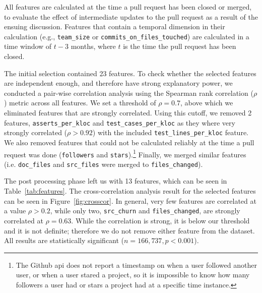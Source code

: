 \documentclass{sig-alternate}
\begin{document}
All features are calculated at the time a pull request has been closed or
merged, to evaluate the effect of intermediate updates to the pull request as a
result of the ensuing discussion. Features that contain a temporal dimension in
their calculation (e.g., \texttt{team\_size} or
\texttt{commits\_on\_files\_touched}) are calculated in a time window of $t - 3$
months, where $t$ is the time the pull request has been closed. 

The initial selection contained 23 features. To check whe\-ther the selected
features are independent enough, and therefore have strong explanatory power, we
conducted a pair-wise correlation analysis using the Spearman rank correlation
($\rho$) metric across all features. We set a threshold of $\rho = 0.7$, above
which we eliminated features that are strongly correlated. Using this cutoff, we
removed 2 features, \texttt{asserts\_per\_kloc} and
\texttt{test\_cases\_per\_kloc} as they where very strongly correlated ($\rho >
0.92$) with the included \texttt{test\_lines\_per\_kloc} feature. We also
removed features that could not be calculated reliably at the time a pull
request was done (\texttt{followers} and \texttt{stars}).\footnote{The Github
{\sc api} does not report a timestamp on when a user followed another user, or
when a user stared a project, so it is impossible to know how many followers a
user had or stars a project had at a specific time instance.} Finally, we
merged similar features (i.e. \texttt{doc\_files} and \texttt{src\_files} were merged to \texttt{files\_changed}). 

The post processing phase left us with
13 features, which can be seen in Table~\ref{tab:features}.
The cross-correlation analysis result for the selected features can be seen in
Figure~\ref{fig:crosscor}. In general, very few features are correlated at a
value $\rho > 0.2$, while only two, \texttt{src\_churn} and
\texttt{files\_changed}, are strongly correlated at $\rho = 0.63$. While the
correlation is strong, it is below our threshold and it is not definite;
therefore we do not remove either feature from the dataset. All results are
statistically significant ($n = 166,737, p < 0.001$).
\end{document}
